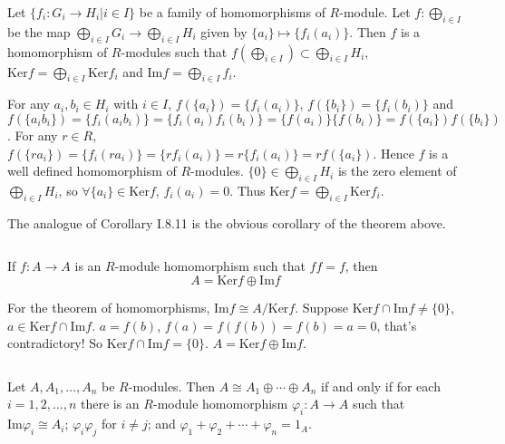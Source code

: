 \begin{answer}
    Let $\{f_{i}:G_{i}\to H_{i}|i\in I\}$ be a family of homomorphisms of $R$-module. Let $f:\bigoplus\limits_{i\in I}$ be the map $\bigoplus\limits_{i\in I}G_{i}\to \bigoplus\limits_{i\in I}H_{i}$ given by $\{a_{i}\}\mapsto \{f_{i}(a_{i})\}$. Then $f$ is a homomorphism of $R$-modules such that $f(\bigoplus\limits_{i\in I})\subset \bigoplus\limits_{i\in I}H_{i}$, $\mathrm{Ker}f=\bigoplus\limits_{i\in I}\mathrm{Ker}f_{i}$ and $\mathrm{Im}f=\bigoplus\limits_{i\in I}f_{i}$.

    For any $a_{i},b_{i}\in H_{i}$ with $i\in I$, $f(\{a_{i}\})=\{f_{i}(a_{i})\}$, $f(\{b_{i}\})=\{f_{i}(b_{i})\}$ and $f(\{a_{i}b_{i}\})=\{f_{i}(a_{i}b_{i})\}=\{f_{i}(a_{i})f_{i}(b_{i})\}=\{f(a_{i})\}\{f(b_{i})\}=f(\{a_{i}\})f(\{b_{i}\})$. For any $r\in R$, $f(\{ra_{i}\})=\{f_{i}(ra_{i})\}=\{rf_{i}(a_{i})\}=r\{f_{i}(a_{i})\}=rf(\{a_{i}\})$. Hence $f$ is a well defined homomorphism of $R$-modules. $\{0\}\in \bigoplus\limits_{i\in I}H_{i}$ is the zero element
     of $\bigoplus\limits_{i\in I}H_{i}$, so $\forall \{a_{i}\}\in \mathrm{Ker}f$, $f_{i}(a_{i})=0$. Thus $\mathrm{Ker}f=\bigoplus\limits_{i\in I}\mathrm{Ker}f_{i}$.

     The analogue of Corollary I.8.11 is the obvious corollary of the theorem above.
\end{answer}

$$ $$

\begin{ex}
    If $f:A\to A$ is an $R$-module homomorphism such that $ff=f$, then \[A=\mathrm{Ker}f\oplus\mathrm{Im}f\]
\end{ex}

\begin{answer}
    For the theorem of homomorphisms, $\mathrm{Im}f\cong A /\mathrm{Ker}f$. Suppose $\mathrm{Ker}f\cap \mathrm{Im}f\neq \{0\}$, $a\in \mathrm{Ker}f\cap \mathrm{Im}f$. $a=f(b)$, $f(a)=f(f(b))=f(b)=a=0$, that's contradictory! So $\mathrm{Ker}f\cap \mathrm{Im}f=\{0\}$. $A=\mathrm{Ker}f\oplus\mathrm{Im}f$.
\end{answer}

$$ $$

\begin{ex}
    Let $A,A_{1},\dots, A_{n}$ be $R$-modules. Then $A\cong A_{1}\oplus\cdots\oplus A_{n}$ if and only if for each $i=1,2,\dots,n$ there is an $R$-module homomorphism $\varphi_{i}:A\to A$ such that $\mathrm{Im}\varphi_{i}\cong A_{i}$; $\varphi_{i}\varphi_{j}$ for $i\neq j$; and $\varphi_{1}+\varphi_{2}+\cdots+\varphi_{n}=1_{A}$.
\end{ex}

